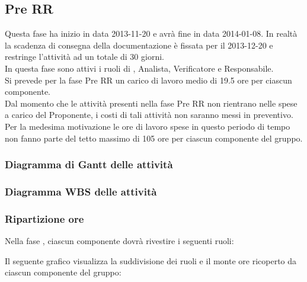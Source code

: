 \subsection{Pre RR}
Questa fase ha inizio in data 2013-11-20 e avrà fine in data 2014-01-08. In realtà la scadenza di consegna della documentazione è fissata per il 2013-12-20 e restringe l'attività ad un totale di 30 giorni.\\
In questa fase sono attivi i ruoli di , Analista, Verificatore e Responsabile.\\
Si prevede per la fase Pre RR un carico di lavoro medio di 19.5 ore per ciascun componente.\\
Dal momento che le attività presenti nella fase Pre RR non rientrano nelle spese a carico del Proponente, i costi di tali attività non saranno messi in preventivo.\\
Per la medesima motivazione le ore di lavoro spese in questo periodo di tempo non fanno parte del tetto massimo di 105 ore per ciascun componente del gruppo.

\subsubsection{Diagramma di Gantt delle attività}

\newpage
\subsubsection{Diagramma WBS delle attività}

\newpage
\subsubsection{Ripartizione ore}

\newpage
Nella fase , ciascun componente dovrà rivestire i seguenti ruoli:

Il seguente grafico visualizza la suddivisione dei ruoli e il monte ore ricoperto da ciascun componente del gruppo:
